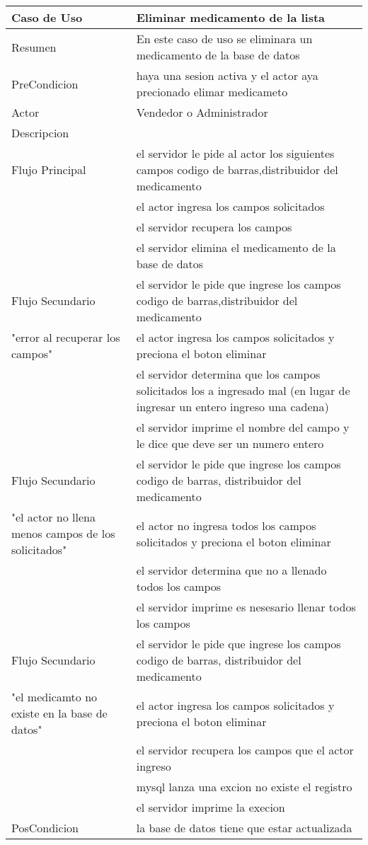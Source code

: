 \documentclass{book}
\begin{document}
	\begin{table}[H]
		\centering
		\begin{tabular}{p{3cm} p{11cm}}
			\hline
				Caso de Uso & Eliminar medicamento de la lista\\
			\hline 
				Resumen & En este caso de uso se eliminara un medicamento de la base de datos\\
			\hline
				PreCondicion&haya una sesion activa y el actor aya precionado elimar medicameto\\
			\hline
				Actor & Vendedor o Administrador\\
			\hline
				Descripcion&\\
				Flujo Principal&el servidor le pide al actor los siguientes campos codigo de barras,distribuidor del medicamento
				\\&el actor ingresa los campos solicitados
				\\&el servidor recupera los campos
				\\&el servidor elimina el medicamento de la base de datos\\
			\hline
				Flujo Secundario&el servidor le pide que ingrese los campos codigo de barras,distribuidor del medicamento\\
				"error al recuperar los campos"& el actor ingresa los campos solicitados y preciona el boton eliminar
				\\&el servidor determina que los campos solicitados los a ingresado mal (en lugar de ingresar un entero ingreso una cadena)
				\\&el servidor imprime el nombre del campo y le dice que deve ser un numero entero\\
			\hline
				Flujo Secundario&el servidor le pide que ingrese los campos codigo de barras, distribuidor del medicamento\\
				"el actor no llena menos campos de los solicitados"&el actor no ingresa todos los campos solicitados y preciona el boton eliminar
				\\&el servidor determina que no a llenado todos los campos
				\\&el servidor imprime es nesesario llenar todos los campos\\
			\hline
				Flujo Secundario&el servidor le pide que ingrese los campos codigo de barras, distribuidor del medicamento\\
				"el medicamto no existe en la base de datos"&el actor ingresa los campos solicitados y preciona el boton eliminar
				\\&el servidor recupera los campos que el actor ingreso
				\\&mysql lanza una excion no existe el registro
				\\&el servidor imprime la execion\\
			\hline
				PosCondicion&la base de datos tiene que estar actualizada\\
			\hline
		\end{tabular}
	\end{table}
\end{document}
